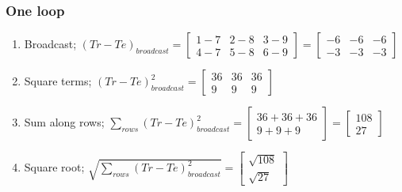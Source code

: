 \documentclass{article}
\begin{document}
\subsubsection{One loop}
\begin{enumerate}
    \item Broadcast; $(Tr-Te)_{broadcast} = 
            \begin{bmatrix}
                1-7 & 2-8 & 3-9 \\
                4-7 & 5-8 & 6-9
            \end{bmatrix} = 
            \begin{bmatrix}
                -6 & -6 & -6 \\
                -3 & -3 & -3
            \end{bmatrix}$ 
    \item Square terms; $(Tr-Te)_{broadcast}^{2} = 
            \begin{bmatrix}
                36 & 36 & 36 \\
                9 & 9 & 9
            \end{bmatrix}$
    \item Sum along rows; $\sum_{rows}(Tr-Te)_{broadcast}^{2} = 
            \begin{bmatrix}
                36+36+36 \\
                9+9+9
            \end{bmatrix} = 
            \begin{bmatrix}
                108 \\
                27
            \end{bmatrix}$
    \item Square root; $\sqrt{\sum_{rows}(Tr-Te)_{broadcast}^{2}} =
                            \begin{bmatrix}
                                \sqrt{108} \\
                                \sqrt{27}
                            \end{bmatrix}$
\end{enumerate}
\end{document}
